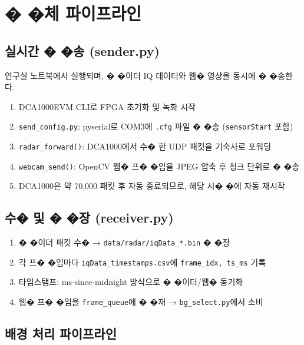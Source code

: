 \documentclass[a4paper,12pt]{article}
\begin{document}
\section{� �체 파이프라인}

\subsection{실시간 � �송 (sender.py)}

연구실 노트북에서 실행되며, � �이더 IQ 데이터와 웹�  영상을 동시에 � �송한다.

\begin{enumerate}[leftmargin=2em]
  \item DCA1000EVM CLI로 FPGA 초기화 및 녹화 시작
  \item \texttt{send\_config.py}: pyserial로 COM3에 \texttt{.cfg} 파일 � �송 (\texttt{sensorStart} 포함)
  \item \texttt{radar\_forward()}: DCA1000에서 수� 한 UDP 패킷을 기숙사로 포워딩
  \item \texttt{webcam\_send()}: OpenCV 웹�  프� �임을 JPEG 압축 후 청크 단위로 � �송
  \item DCA1000은 약 70,000 패킷 후 자동 종료되므로, 해당 시� �에 자동 재시작
\end{enumerate}

\subsection{수�  및 � �장 (receiver.py)}

\begin{enumerate}[leftmargin=2em]
  \item � �이더 패킷 수�  → \texttt{data/radar/iqData\_*.bin} � �장
  \item 각 프� �임마다 \texttt{iqData\_timestamps.csv}에 \texttt{frame\_idx, ts\_ms} 기록
  \item 타임스탬프: ms-since-midnight 방식으로 � �이더/웹�  동기화
  \item 웹�  프� �임을 \texttt{frame\_queue}에 � �재 → \texttt{bg\_select.py}에서 소비
\end{enumerate}

\subsection{배경 처리 파이프라인}
\end{document}
